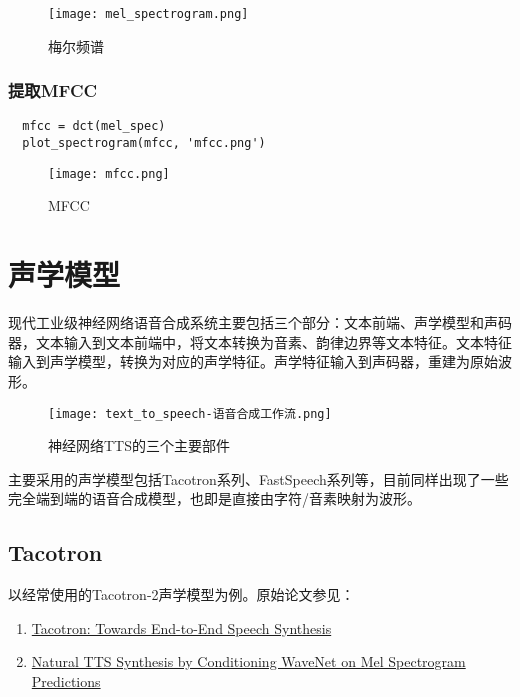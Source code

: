 \documentclass[cn,10pt,math=newtx,citestyle=gb7714-2015,bibstyle=gb7714-2015]{elegantbook}
\begin{document}
\begin{figure}[htbp]
  \centering
  \texttt{[image: mel\_spectrogram.png]}
  \caption{梅尔频谱 \label{fig:mel_spectrogram}}
\end{figure}

\subsection{提取MFCC}

\begin{lstlisting}
  mfcc = dct(mel_spec)
  plot_spectrogram(mfcc, 'mfcc.png')
\end{lstlisting}

\begin{figure}[htbp]
  \centering
  \texttt{[image: mfcc.png]}
  \caption{MFCC \label{fig:mfcc}}
\end{figure}






\chapter{声学模型}

现代工业级神经网络语音合成系统主要包括三个部分：文本前端、声学模型和声码器，文本输入到文本前端中，将文本转换为音素、韵律边界等文本特征。文本特征输入到声学模型，转换为对应的声学特征。声学特征输入到声码器，重建为原始波形。

\begin{figure}[htbp]
  \centering
  \texttt{[image: text\_to\_speech-语音合成工作流.png]}
  \caption{神经网络TTS的三个主要部件 \label{fig:main_components_in_tts}}
\end{figure}

主要采用的声学模型包括Tacotron系列、FastSpeech系列等，目前同样出现了一些完全端到端的语音合成模型，也即是直接由字符/音素映射为波形。

\section{Tacotron}

以经常使用的Tacotron-2声学模型为例。原始论文参见：

\begin{enumerate}
  \item \href{https://arxiv.org/abs/1703.10135}{Tacotron: Towards End-to-End Speech Synthesis}
  \item \href{https://arxiv.org/abs/1712.05884}{Natural TTS Synthesis by Conditioning WaveNet on Mel Spectrogram Predictions}
\end{enumerate}
\end{document}
